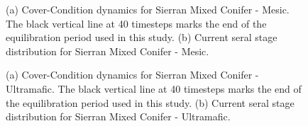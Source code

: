 \begin{figure}[!htbp]
  \centering
  \caption{(a) Cover-Condition dynamics for Sierran Mixed Conifer - Mesic. The black vertical line at 40 timesteps marks the end of the equilibration period used in this study. (b) Current seral stage distribution for Sierran Mixed Conifer - Mesic.} 
  \label{fig:covcond_smcm}
\end{figure}

\begin{figure}[!htbp]
  \centering
  \caption{(a) Cover-Condition dynamics for Sierran Mixed Conifer - Ultramafic. The black vertical line at 40 timesteps marks the end of the equilibration period used in this study. (b) Current seral stage distribution for Sierran Mixed Conifer - Ultramafic.} 
  \label{fig:covcond_smcu}
\end{figure}

